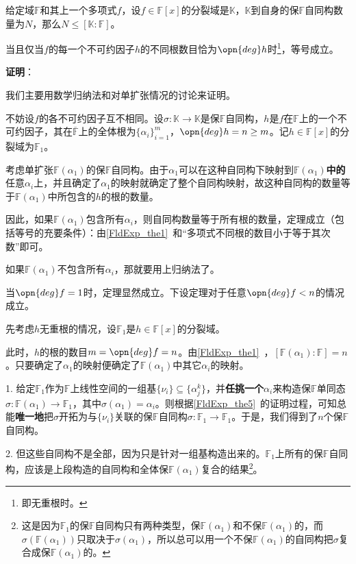 \begin{theorem}{}\label{SpltFd_the1}
给定域$\mathbb{F}$和其上一个多项式$f$，设$f\in\mathbb{F}[x]$的分裂域是$\mathbb{K}$，$\mathbb{K}$到自身的保$\mathbb{F}$自同构数量为$N$，那么$N\leq[\mathbb{K}:\mathbb{F}]$。

当且仅当$f$的每一个不可约因子$h$的不同根数目恰为$\opn{deg}h$时\footnote{即无重根时。}，等号成立。
\end{theorem}

\textbf{证明}：

我们主要用数学归纳法和对单扩张情况的讨论来证明。

不妨设$f$的各不可约因子互不相同。设$\sigma:\mathbb{K}\to\mathbb{K}$是保$\mathbb{F}$自同构，$h$是$f$在$\mathbb{F}$上的一个不可约因子，其在$\overline{\mathbb{F}}$上的全体根为$\{\alpha_i\}_{i=1}^m$，$\opn{deg}h=n\geq m$。记$h\in\mathbb{F}[x]$的分裂域为$\mathbb{F}_1$。

考虑单扩张$\mathbb{F}(\alpha_1)$的保$\mathbb{F}$自同构。由于$\alpha_1$可以在这种自同构下映射到$\mathbb{F}(\alpha_1)$\textbf{中的}任意$\alpha_i$上，并且确定了$\alpha_1$的映射就确定了整个自同构映射，故这种自同构的数量等于$\mathbb{F}(\alpha_1)$中所包含的$h$的根的数量。

因此，如果$\mathbb{F}(\alpha_1)$包含所有$\alpha_i$，则自同构数量等于所有根的数量，定理成立（包括等号的充要条件）：由\autoref{FldExp_the1}~和“多项式不同根的数目小于等于其次数”即可。

如果$\mathbb{F}(\alpha_1)$不包含所有$\alpha_i$，那就要用上归纳法了。

当$\opn{deg}f=1$时，定理显然成立。下设定理对于任意$\opn{deg}f<n$的情况成立。

先考虑$h$无重根的情况，设$\mathbb{F}_1$是$h\in\mathbb{F}[x]$的分裂域。

此时，$h$的根的数目$m=\opn{deg}f=n$。由\autoref{FldExp_the1}~，$[\mathbb{F}(\alpha_1):
\mathbb{F}]=n$。只要确定了$\alpha_1$的映射便确定了$\mathbb{F}(\alpha_1)$中其它$\alpha_i$的映射。

1. 给定$\mathbb{F}_1$作为$\mathbb{F}$上线性空间的一组基$\{\nu_i\}\subseteq\{\alpha_j^k\}$，并\textbf{任挑一个}$\alpha_i$来构造保$\mathbb{F}$单同态$\sigma: \mathbb{F}(\alpha_1)\to\mathbb{F}_1$，其中$\sigma(\alpha_1)=\alpha_i$。则根据\autoref{FldExp_the5}~的证明过程，可知总能\textbf{唯一地}把$\sigma$开拓为与$\{\nu_i\}$关联的保$\mathbb{F}$自同构$\sigma: \mathbb{F}_1\to\mathbb{F}_1$。于是，我们得到了$n$个保$\mathbb{F}$自同构。

2. 但这些自同构不是全部，因为只是针对一组基构造出来的。$\mathbb{F}_1$上所有的保$\mathbb{F}$自同构，应该是上段构造的自同构和全体保$\mathbb{F}(\alpha_1)$复合的结果\footnote{这是因为$\mathbb{F}_1$的保$\mathbb{F}$自同构只有两种类型，保$\mathbb{F}(\alpha_1)$和不保$\mathbb{F}(\alpha_1)$的，而$\sigma(\mathbb{F}(\alpha_1))$只取决于$\sigma(\alpha_1)$，所以总可以用一个不保$\mathbb{F}(\alpha_1)$的自同构把$\sigma$复合成保$\mathbb{F}(\alpha_1)$的。}。

